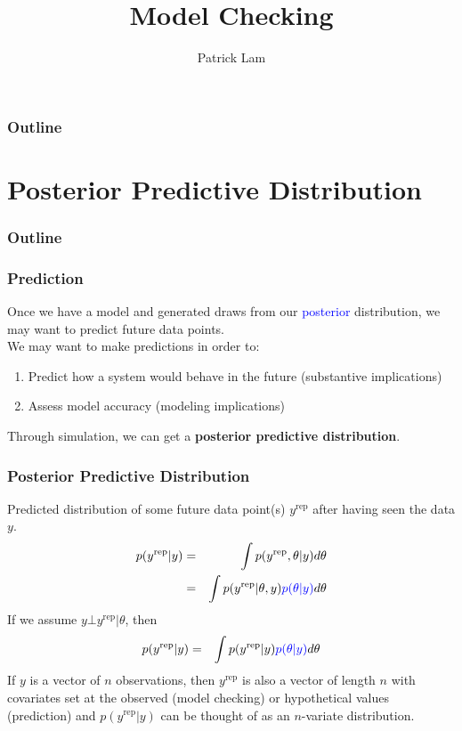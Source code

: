 \documentclass[handout]{beamer}
\author{Patrick Lam}
\title{Model Checking}
\date{}
\begin{document}
\newcommand{\red}{\textcolor{red}}
\newcommand{\blue}{\textcolor{blue}}
\newcommand{\purple}{\textcolor{purple}}

\frame{\titlepage}

\begin{frame}
\frametitle{Outline}
\tableofcontents
\end{frame}

\section{Posterior Predictive Distribution}

\begin{frame}
\frametitle{Outline}
\tableofcontents[currentsection]
\end{frame}

\begin{frame}
\frametitle{Prediction}
\pause
Once we have a model and generated draws from our \blue{posterior}
distribution, we may want to predict future data points.  \\
\pause
\bigskip
We may want to make predictions in order to:
\pause
\begin{enumerate}
\item Predict how a system would behave in the future (substantive implications)
\pause
\item Assess model accuracy (modeling implications)
\end{enumerate}
\pause
\bigskip
Through simulation, we can get a \textbf{posterior predictive distribution}.
\end{frame}

\begin{frame}
\frametitle{Posterior Predictive Distribution}
\pause
Predicted distribution of some future data point(s) $y^{\mathrm{rep}}$ after
having seen the data $y$.
\pause
\begin{eqnarray*}
p(y^{\mathrm{rep}} | y) &=& \int p(y^{\mathrm{rep}}, \theta | y) d\theta \\
&=& \int p(y^{\mathrm{rep}} | \theta, y) \textcolor{blue}{p(\theta | y)} d\theta
\end{eqnarray*}
\pause
If we assume $y \bot y^{\mathrm{rep}} | \theta$, then
\pause
\begin{eqnarray*}
p(y^{\mathrm{rep}} | y) &=&  \int p(y^{\mathrm{rep}} | y) \textcolor{blue}{p(\theta | y)} d\theta
\end{eqnarray*}
\pause
If $y$ is a vector of $n$ observations, then $y^{\mathrm{rep}}$ is
also a vector of length $n$ with covariates set at the observed (model
checking) or hypothetical values (prediction) \pause and
$p(y^{\mathrm{rep}} | y)$ can be thought of as an $n$-variate distribution.
\end{frame}
\end{document}
